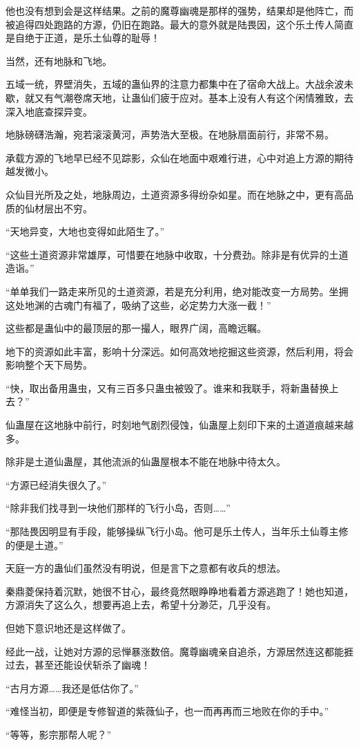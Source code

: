 \begin{this_body}
他也没有想到会是这样结果。之前的魔尊幽魂是那样的强势，结果却是他阵亡，而被追得四处跑路的方源，仍旧在跑路。最大的意外就是陆畏因，这个乐土传人简直是自绝于正道，是乐土仙尊的耻辱！

当然，还有地脉和飞地。

五域一统，界壁消失，五域的蛊仙界的注意力都集中在了宿命大战上。大战余波未歇，就又有气潮卷席天地，让蛊仙们疲于应对。基本上没有人有这个闲情雅致，去深入地底查探异变。

地脉磅礴浩瀚，宛若滚滚黄河，声势浩大至极。在地脉扇面前行，非常不易。

承载方源的飞地早已经不见踪影，众仙在地面中艰难行进，心中对追上方源的期待越发微小。

众仙目光所及之处，地脉周边，土道资源多得纷杂如星。而在地脉之中，更有高品质的仙材层出不穷。

“天地异变，大地也变得如此陌生了。”

“这些土道资源非常雄厚，可惜要在地脉中收取，十分费劲。除非是有优异的土道造诣。”

“单单我们一路走来所见的土道资源，若是充分利用，绝对能改变一方局势。坐拥这处地渊的古魂门有福了，吸纳了这些，必定势力大涨一截！”

这些都是蛊仙中的最顶层的那一撮人，眼界广阔，高瞻远瞩。

地下的资源如此丰富，影响十分深远。如何高效地挖掘这些资源，然后利用，将会影响整个天下局势。

“快，取出备用蛊虫，又有三百多只蛊虫被毁了。谁来和我联手，将新蛊替换上去？”

仙蛊屋在这地脉中前行，时刻地气剧烈侵蚀，仙蛊屋上刻印下来的土道道痕越来越多。

除非是土道仙蛊屋，其他流派的仙蛊屋根本不能在地脉中待太久。

“方源已经消失很久了。”

“除非我们找寻到一块他们那样的飞行小岛，否则……”

“那陆畏因明显有手段，能够操纵飞行小岛。他可是乐土传人，当年乐土仙尊主修的便是土道。”

天庭一方的蛊仙们虽然没有明说，但是言下之意都有收兵的想法。

秦鼎菱保持着沉默，她很不甘心，最终竟然眼睁睁地看着方源逃跑了！她也知道，方源消失了这么久，想要再追上去，希望十分渺茫，几乎没有。

但她下意识地还是这样做了。

经此一战，让她对方源的忌惮暴涨数倍。魔尊幽魂亲自追杀，方源居然连这都能捱过去，甚至还能设伏斩杀了幽魂！

“古月方源……我还是低估你了。”

“难怪当初，即便是专修智道的紫薇仙子，也一而再再而三地败在你的手中。”

“等等，影宗那帮人呢？”

\end{this_body}

